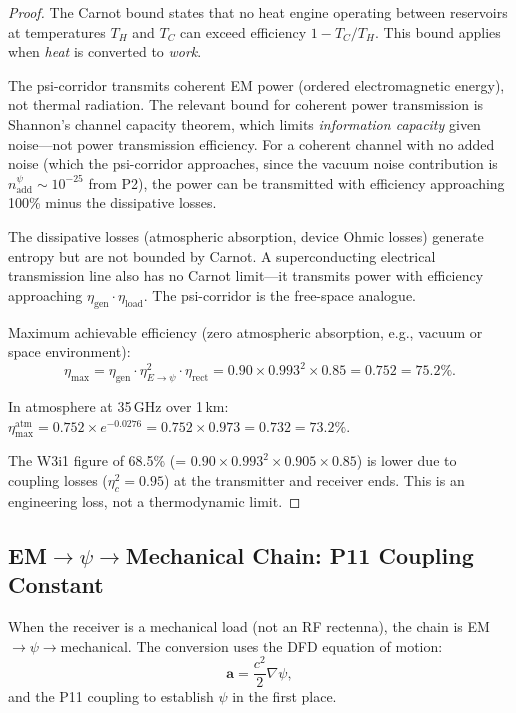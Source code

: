 \documentclass[aps,prd,twocolumn,superscriptaddress]{revtex4-2}
\begin{document}
\begin{proof}[Proof]
The Carnot bound states that no heat engine operating between reservoirs
at temperatures $T_H$ and $T_C$ can exceed efficiency $1 - T_C/T_H$.
This bound applies when \emph{heat} is converted to \emph{work}.

The psi-corridor transmits coherent EM power (ordered electromagnetic
energy), not thermal radiation.  The relevant bound for coherent power
transmission is Shannon's channel capacity theorem, which limits
\emph{information capacity} given noise---not power transmission
efficiency.  For a coherent channel with no added noise
(which the psi-corridor approaches, since the vacuum noise contribution
is $n_\mathrm{add}^\psi \sim 10^{-25}$ from P2), the power can be
transmitted with efficiency approaching 100\% minus the dissipative
losses.

The dissipative losses (atmospheric absorption, device Ohmic losses)
generate entropy but are not bounded by Carnot.  A superconducting
electrical transmission line also has no Carnot limit---it transmits
power with efficiency approaching $\eta_\mathrm{gen}\cdot\eta_\mathrm{load}$.
The psi-corridor is the free-space analogue.

Maximum achievable efficiency (zero atmospheric absorption,
e.g., vacuum or space environment):
\begin{equation}
\eta_\mathrm{max} = \eta_\mathrm{gen}\cdot\eta_{E\to\psi}^2\cdot\eta_\mathrm{rect}
= 0.90\times0.993^2\times0.85 = 0.752 = 75.2\%.
\end{equation}

In atmosphere at 35\,GHz over 1\,km:
$\eta_\mathrm{max}^\mathrm{atm} = 0.752\times e^{-0.0276} = 0.752\times0.973 = 0.732 = 73.2\%$.

The W3i1 figure of 68.5\% (= $0.90\times0.993^2\times0.905\times0.85$)
is lower due to coupling losses ($\eta_c^2 = 0.95$) at the
transmitter and receiver ends.  This is an engineering loss, not
a thermodynamic limit.
\end{proof}

\subsection{EM$\to\psi\to$Mechanical Chain: P11 Coupling Constant}

When the receiver is a mechanical load (not an RF rectenna), the
chain is EM$\to\psi\to$mechanical.  The conversion uses the DFD
equation of motion:
\begin{equation}
\mathbf{a} = \frac{c^2}{2}\nabla\psi,
\end{equation}
and the P11 coupling to establish $\psi$ in the first place.
\end{document}
